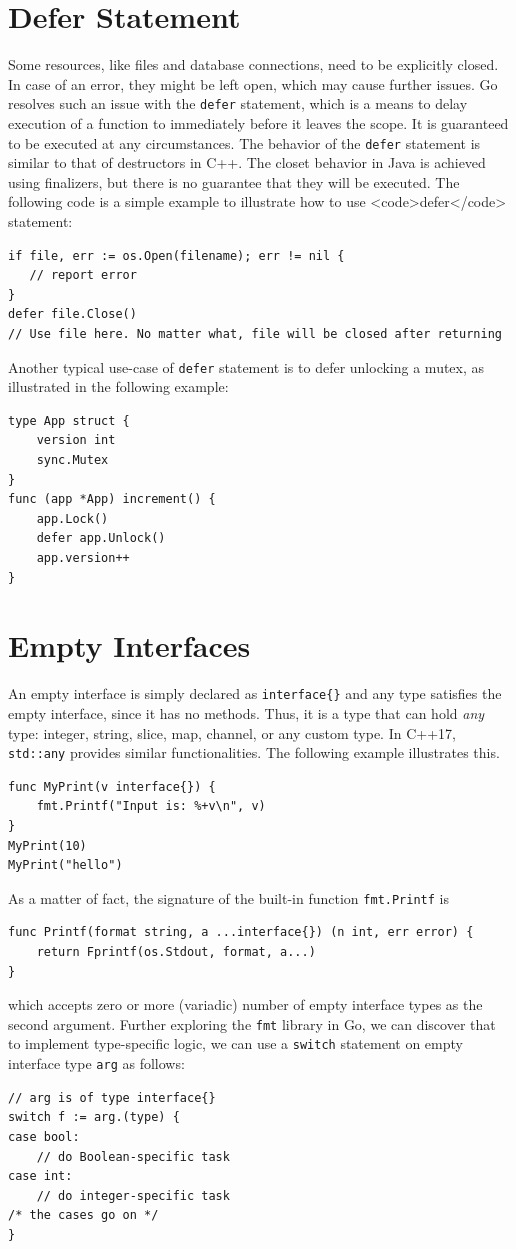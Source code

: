 \documentclass[11pt]{article}
\begin{document}
\section*{Defer Statement}
\label{sec:orgheadline12}
Some resources, like files and database connections, need to be explicitly closed. In case of an error, they might be left open, which may cause further issues. Go resolves such an issue with the \texttt{defer} statement, which is a means to delay execution of a function to immediately before it leaves the scope. It is guaranteed to be executed at any circumstances. The behavior of the \texttt{defer} statement is similar to that of destructors in C++. The closet behavior in Java is achieved using finalizers, but there is no guarantee that they will be executed. The following code is a simple example to illustrate how to use <code>defer</code> statement:
\begin{verbatim}
if file, err := os.Open(filename); err != nil {
   // report error
}
defer file.Close()
// Use file here. No matter what, file will be closed after returning
\end{verbatim}
Another typical use-case of \texttt{defer} statement is to defer unlocking a mutex, as illustrated in the following example:
\begin{verbatim}
type App struct {
    version int
    sync.Mutex
}
func (app *App) increment() {
    app.Lock()
    defer app.Unlock()
    app.version++
}
\end{verbatim}
\section*{Empty Interfaces}
\label{sec:orgheadline13}
An empty interface is simply declared as \texttt{interface\{\}} and any type satisfies the empty interface, since it has no methods. Thus, it is a type that can hold \emph{any} type: integer, string, slice, map, channel, or any custom type. In C++17, \texttt{std::any} provides similar functionalities. The following example illustrates this.
\begin{verbatim}
func MyPrint(v interface{}) {
    fmt.Printf("Input is: %+v\n", v)
}
MyPrint(10)
MyPrint("hello")
\end{verbatim}
As a matter of fact, the signature of the built-in function \texttt{fmt.Printf} is
\begin{verbatim}
func Printf(format string, a ...interface{}) (n int, err error) {
    return Fprintf(os.Stdout, format, a...)
}
\end{verbatim}
which accepts zero or more (variadic) number of empty interface types as the second argument. Further exploring the \texttt{fmt} library in Go, we can discover that to implement type-specific logic, we can use a \texttt{switch} statement on empty interface type \texttt{arg} as follows:
\begin{verbatim}
// arg is of type interface{}
switch f := arg.(type) {
case bool:
    // do Boolean-specific task
case int:
    // do integer-specific task
/* the cases go on */
}
\end{verbatim}
\end{document}
